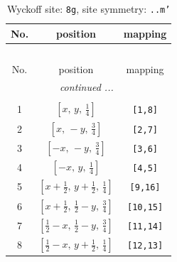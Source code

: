 \documentclass[fleqn,8pt]{jsarticle}
\begin{document}
\begin{longtable}{ccc}
\caption{Wyckoff site: {\tt 8g}, site symmetry: {\tt ..m'}}
 \\
 \hline \hline
No. & position & mapping \\ \hline \endfirsthead

\multicolumn{2}{l}{\tablename\ \thetable{}} \\
 \hline \hline
No. & position & mapping \\ \hline \endhead

 \hline \hline
\multicolumn{2}{r}{\footnotesize\it continued ...} \\ \endfoot

 \hline \hline
\multicolumn{2}{r}{} \\ \endlastfoot

1 & $\left[ x,\, y,\, \frac{1}{4} \right]$ & {\tt [1,8]} \\ \hline
2 & $\left[ x,\, - y,\, \frac{3}{4} \right]$ & {\tt [2,7]} \\ \hline
3 & $\left[ - x,\, - y,\, \frac{3}{4} \right]$ & {\tt [3,6]} \\ \hline
4 & $\left[ - x,\, y,\, \frac{1}{4} \right]$ & {\tt [4,5]} \\ \hline
5 & $\left[ x + \frac{1}{2},\, y + \frac{1}{2},\, \frac{1}{4} \right]$ & {\tt [9,16]} \\ \hline
6 & $\left[ x + \frac{1}{2},\, \frac{1}{2} - y,\, \frac{3}{4} \right]$ & {\tt [10,15]} \\ \hline
7 & $\left[ \frac{1}{2} - x,\, \frac{1}{2} - y,\, \frac{3}{4} \right]$ & {\tt [11,14]} \\ \hline
8 & $\left[ \frac{1}{2} - x,\, y + \frac{1}{2},\, \frac{1}{4} \right]$ & {\tt [12,13]} \\
\end{longtable}
\renewcommand{\arraystretch}{1.2}
\end{document}
